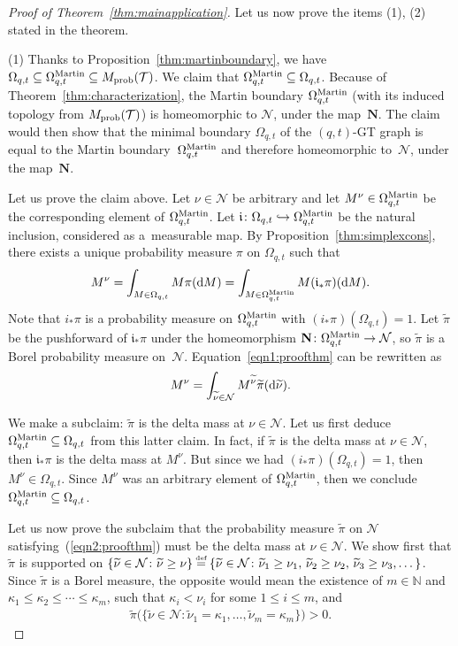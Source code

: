 \documentclass[pdftex]{sigma}
\numberwithin{equation}{section}
\newcommand\myeq{\mathrel{\stackrel{\makebox[0pt]{\mbox{\normalfont\tiny def}}}{=}}}
\newcommand{\N}{\mathbb{N}}
\newcommand{\Nu}{\mathcal{N}}
\newcommand{\Tau}{\mathcal{T}}
\newcommand{\Mart}{\Omega_{q, t}^{\rm Martin}}
\newcommand{\NN}{\mathbf{N}}
\begin{document}
\begin{proof}[Proof of Theorem~\ref{thm:mainapplication}]
Let us now prove the items (1), (2) stated in the theorem.

(1) Thanks to Proposition~\ref{thm:martinboundary}, we have $\Omega_{q, t} \subseteq \Mart \subseteq M_{\rm prob}(\Tau)$. We claim that $\Mart \subseteq \Omega_{q, t}$. Because of Theorem~\ref{thm:characterization}, the Martin boundary $\Mart$ (with its induced topology from $M_{\rm prob}(\Tau)$) is homeomorphic to $\Nu$, under the map~$\NN$.
The claim would then show that the minimal boundary $\Omega_{q, t}$ of the $(q, t)$-GT graph is equal to the Martin boundary~$\Mart$ and therefore homeomorphic to~$\Nu$, under the map~$\NN$.

Let us prove the claim above. Let $\nu\in\Nu$ be arbitrary and let $M^{\nu}\in\Mart$ be the corresponding element of $\Mart$. Let $\mathfrak{i} \colon \Omega_{q, t} \hookrightarrow \Mart$ be the natural inclusion, considered as a~measurable map. By Proposition~\ref{thm:simplexcons}, there exists a unique probability measure $\pi$ on $\Omega_{q, t}$ such that
\begin{gather}\label{eqn1:proofthm}
M^{\nu} = \int_{M\in\Omega_{q, t}}{M\pi({\rm d}M)} = \int_{M\in\Mart}{M(\mathfrak{i}_*\pi)({\rm d}M)}.
\end{gather}
Note that $i_*\pi$ is a probability measure on $\Mart$ with $(i_*\pi)(\Omega_{q, t}) = 1$. Let $\widetilde{\pi}$ be the pushforward of $\mathfrak{i}_*\pi$ under the homeomorphism $\NN\colon \Mart \rightarrow \Nu$, so $\widetilde{\pi}$ is a Borel probability measure on~$\Nu$. Equation~\eqref{eqn1:proofthm} can be rewritten as
\begin{gather}\label{eqn2:proofthm}
M^{\nu} = \int_{\widetilde{\nu}\in\Nu}{M^{\widetilde{\nu}}\widetilde{\pi}({\rm d}\widetilde{\nu})}.
\end{gather}

We make a subclaim: $\widetilde{\pi}$ is the delta mass at $\nu\in\Nu$. Let us f\/irst deduce $\Mart \subseteq \Omega_{q, t}$ from this latter claim. In fact, if $\widetilde{\pi}$ is the delta mass at $\nu\in\Nu$, then $\mathfrak{i}_*\pi$ is the delta mass at $M^{\nu}$. But since we had $(i_*\pi)(\Omega_{q, t}) = 1$, then $M^{\nu} \in \Omega_{q, t}$. Since $M^{\nu}$ was an arbitrary element of $\Mart$, then we conclude $\Mart \subseteq \Omega_{q, t}$.

Let us now prove the subclaim that the probability measure $\widetilde{\pi}$ on $\Nu$ satisfying~(\ref{eqn2:proofthm}) must be the delta mass at $\nu\in\Nu$.
We show f\/irst that $\widetilde{\pi}$ is supported on $\{\widetilde{\nu}\in\Nu \colon \widetilde{\nu} \geq \nu\} \myeq \{\widetilde{\nu}\in\Nu \colon \widetilde{\nu}_1 \geq \nu_1,\, \widetilde{\nu}_2 \geq \nu_2,\, \widetilde{\nu}_3 \geq \nu_3, \dots\}$.
Since $\widetilde{\pi}$ is a Borel measure, the opposite would mean the existence of $m\in\N$ and $\kappa_1 \leq \kappa_2 \leq \cdots \leq \kappa_m$, such that $\kappa_i < \nu_i$ for some $1\leq i\leq m$, and
\begin{gather*}
\widetilde{\pi}\big( \big\{\widetilde{\nu}\in\Nu \colon \widetilde{\nu}_1 = \kappa_1, \dots, \widetilde{\nu}_m = \kappa_m \big\} \big) > 0.
\end{gather*}


\end{proof}
\end{document}
